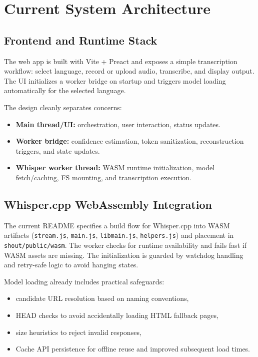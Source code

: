 \documentclass[11pt]{article}
\begin{document}
\section{Current System Architecture}
\subsection{Frontend and Runtime Stack}
The web app is built with Vite + Preact and exposes a simple transcription workflow: select language, record or upload audio, transcribe, and display output. The UI initializes a worker bridge on startup and triggers model loading automatically for the selected language.

The design cleanly separates concerns:
\begin{itemize}
    \item \textbf{Main thread/UI:} orchestration, user interaction, status updates.
    \item \textbf{Worker bridge:} confidence estimation, token sanitization, reconstruction triggers, and state updates.
    \item \textbf{Whisper worker thread:} WASM runtime initialization, model fetch/caching, FS mounting, and transcription execution.
\end{itemize}

\subsection{Whisper.cpp WebAssembly Integration}
The current README specifies a build flow for Whisper.cpp into WASM artifacts (\texttt{stream.js}, \texttt{main.js}, \texttt{libmain.js}, \texttt{helpers.js}) and placement in \texttt{shout/public/wasm}. The worker checks for runtime availability and fails fast if WASM assets are missing. The initialization is guarded by watchdog handling and retry-safe logic to avoid hanging states.

Model loading already includes practical safeguards:
\begin{itemize}
    \item candidate URL resolution based on naming conventions,
    \item HEAD checks to avoid accidentally loading HTML fallback pages,
    \item size heuristics to reject invalid responses,
    \item Cache API persistence for offline reuse and improved subsequent load times.
\end{itemize}
\end{document}
